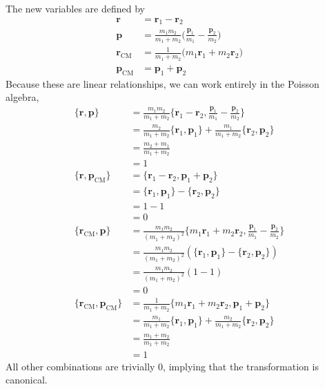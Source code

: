 \documentclass[../principles-of-quantum-mechanics.tex]{subfiles}
\begin{document}
\begin{questions}
		\begin{solution}
			The new variables are defined by
			\begin{align*}
				\mathbf{r} &= \mathbf{r}_1 - \mathbf{r}_2 \\
				\mathbf{p} &= \frac{m_1m_2}{m_1+m_2}\Big(\frac{\mathbf{p}_1}{m_1} - \frac{\mathbf{p}_2}{m_2}\Big) \\
				\mathbf{r}_{\text{CM}} &= \frac{1}{m_1 + m_2}\Big(m_1\mathbf{r}_1 + m_2\mathbf{r}_2\Big) \\
				\mathbf{p}_{\text{CM}} &= \mathbf{p}_1 + \mathbf{p}_2
			\end{align*}
			Because these are linear relationships, we can work entirely in the Poisson algebra,
			\begin{align*}
				\{\mathbf{r}, \mathbf{p}\} &= \frac{m_1m_2}{m_1+m_2}\{\mathbf{r}_1-\mathbf{r}_2, \frac{\mathbf{p}_1}{m_1} - \frac{\mathbf{p}_2}{m_2}\} \\
				&= \frac{m_2}{m_1+m_2}\{\mathbf{r}_1, \mathbf{p}_1\} + \frac{m_1}{m_1+m_2}\{\mathbf{r}_2, \mathbf{p}_2\} \\
				&= \frac{m_2 + m_1}{m_1 + m_2} \\
				&= 1 \\
				\{\mathbf{r}, \mathbf{p}_{\text{CM}}\} &= \{\mathbf{r}_1 - \mathbf{r}_2, \mathbf{p}_1 + \mathbf{p}_2\} \\
				&= \{\mathbf{r}_1, \mathbf{p}_1\} - \{\mathbf{r}_2, \mathbf{p}_2\} \\
				&= 1 - 1 \\
				&= 0 \\
				\{\mathbf{r}_{\text{CM}}, \mathbf{p}\} &= \frac{m_1m_2}{(m_1+m_2)^2}\{m_1\mathbf{r}_1 + m_2\mathbf{r}_2, \frac{\mathbf{p}_1}{m_1} - \frac{\mathbf{p}_2}{m_2}\} \\
				&= \frac{m_1m_2}{(m_1+m_2)^2}(\{\mathbf{r}_1, \mathbf{p}_1\} - \{\mathbf{r}_2, \mathbf{p}_2\}) \\
				&= \frac{m_1m_2}{(m_1+m_2)^2}(1 - 1) \\
				&= 0 \\
				\{\mathbf{r}_{\text{CM}}, \mathbf{p}_{\text{CM}}\} &= \frac{1}{m_1+m_2}\{m_1\mathbf{r}_1 + m_2\mathbf{r}_2, \mathbf{p}_1 + \mathbf{p}_2\} \\
				&= \frac{m_1}{m_1 + m_2}\{\mathbf{r}_1, \mathbf{p}_1\} + \frac{m_2}{m_1 + m_2}\{\mathbf{r}_2, \mathbf{p}_2\} \\
				&= \frac{m_1 + m_2}{m_1 + m_2} \\
				&= 1
			\end{align*}
			All other combinations are trivially $0$, implying that the transformation is canonical.
		\end{solution}
		

\end{questions}
\end{document}
